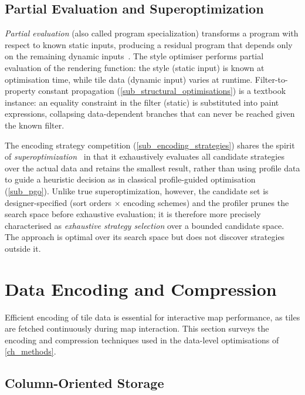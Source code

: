 \subsection{Partial Evaluation and Superoptimization}\label{sub_partial_eval}

\emph{Partial evaluation} (also called program specialization) transforms a program with respect to known static inputs, producing a residual program that depends only on the remaining dynamic inputs~\cite{jonesPartialEvaluationAutomatic1993}.
The style optimiser performs partial evaluation of the rendering function: the style (static input) is known at optimisation time, while tile data (dynamic input) varies at runtime.
Filter-to-property constant propagation (\cref{sub_structural_optimisations}) is a textbook instance: an equality constraint in the filter (static) is substituted into paint expressions, collapsing data-dependent branches that can never be reached given the known filter.

The encoding strategy competition (\cref{sub_encoding_strategies}) shares the spirit of \emph{superoptimization}~\cite{massalinSuperoptimizerLookingShortest1987} in that it exhaustively evaluates all candidate strategies over the actual data and retains the smallest result, rather than using profile data to guide a heuristic decision as in classical profile-guided optimisation (\cref{sub_pgo}).
Unlike true superoptimization, however, the candidate set is designer-specified (sort orders $\times$ encoding schemes) and the profiler prunes the search space before exhaustive evaluation; it is therefore more precisely characterised as \emph{exhaustive strategy selection} over a bounded candidate space.
The approach is optimal over its search space but does not discover strategies outside it.


\section{Data Encoding and Compression}\label{sec_data_encoding}

Efficient encoding of tile data is essential for interactive map performance, as tiles are fetched continuously during map interaction.
This section surveys the encoding and compression techniques used in the data-level optimisations of \cref{ch_methods}.

\subsection{Column-Oriented Storage}\label{sub_column_storage}

